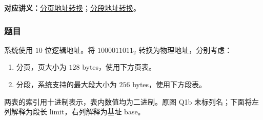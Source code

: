 
\begingroup
\renewcommand{\recordid}[1]{}
\renewcommand{\relatedtopic}[2]{\hyperref[topic:#1]{#2}}

\label{tutorial:SC2005-TUT09}



\textbf{对应讲义：}\relatedtopic{SC2005-L16-T01}{分页地址转换}；\relatedtopic{SC2005-L16-T05}{分段地址转换}。

\subsubsection*{题目}

系统使用 $10$ 位逻辑地址。将 $1000011011_2$ 转换为物理地址，分别考虑：
\begin{enumerate}[label=(\alph*)]
  \item 分页，页大小为 $128$ bytes，使用下方页表。
  \item 分段，系统支持的最大段大小为 $256$ bytes，使用下方段表。
\end{enumerate}
两表的索引用十进制表示，表内数值均为二进制。原图 Q1b 未标列名；下面将左列解释为段长 limit，右列解释为基址 base。

